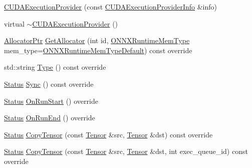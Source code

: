 \begin{DoxyCompactItemize}
\item 
\mbox{\hyperlink{classonnxruntime_1_1CUDAExecutionProvider_a72cfc3ceddf32a30387296364cc3ea35}{C\+U\+D\+A\+Execution\+Provider}} (const \mbox{\hyperlink{structonnxruntime_1_1CUDAExecutionProviderInfo}{C\+U\+D\+A\+Execution\+Provider\+Info}} \&info)
\item 
virtual \mbox{\hyperlink{classonnxruntime_1_1CUDAExecutionProvider_a98fd8afe88815ad4c423edb8e39f7885}{$\sim$\+C\+U\+D\+A\+Execution\+Provider}} ()
\item 
\mbox{\hyperlink{namespaceonnxruntime_a6cdac724c5dcefded3a63f08dae58fda}{Allocator\+Ptr}} \mbox{\hyperlink{classonnxruntime_1_1CUDAExecutionProvider_a01469a525b621ce14a85fcc8187847c4}{Get\+Allocator}} (int id, \mbox{\hyperlink{allocator__info_8h_add3f8ee3ff93395704abae71c30cab18}{O\+N\+N\+X\+Runtime\+Mem\+Type}} mem\+\_\+type=\mbox{\hyperlink{allocator__info_8h_add3f8ee3ff93395704abae71c30cab18a232271cbf46c229ed40272a63af7a204}{O\+N\+N\+X\+Runtime\+Mem\+Type\+Default}}) const override
\item 
std\+::string \mbox{\hyperlink{classonnxruntime_1_1CUDAExecutionProvider_aba2225328bd739b5e6ef4be06557985b}{Type}} () const override
\item 
\mbox{\hyperlink{classonnxruntime_1_1common_1_1Status}{Status}} \mbox{\hyperlink{classonnxruntime_1_1CUDAExecutionProvider_a4f3479126d1191bb1074c4b953b3ef87}{Sync}} () const override
\item 
\mbox{\hyperlink{classonnxruntime_1_1common_1_1Status}{Status}} \mbox{\hyperlink{classonnxruntime_1_1CUDAExecutionProvider_abf7e482aba687b89fcbd6586271ca753}{On\+Run\+Start}} () override
\item 
\mbox{\hyperlink{classonnxruntime_1_1common_1_1Status}{Status}} \mbox{\hyperlink{classonnxruntime_1_1CUDAExecutionProvider_aad4464387bb09d2337e334d5a7325e5d}{On\+Run\+End}} () override
\item 
\mbox{\hyperlink{classonnxruntime_1_1common_1_1Status}{Status}} \mbox{\hyperlink{classonnxruntime_1_1CUDAExecutionProvider_a6f2ec2e4082683b6de03eeb48acbf546}{Copy\+Tensor}} (const \mbox{\hyperlink{classonnxruntime_1_1Tensor}{Tensor}} \&src, \mbox{\hyperlink{classonnxruntime_1_1Tensor}{Tensor}} \&dst) const override
\item 
\mbox{\hyperlink{classonnxruntime_1_1common_1_1Status}{Status}} \mbox{\hyperlink{classonnxruntime_1_1CUDAExecutionProvider_a7238cead30fe69540b3df62e6913d579}{Copy\+Tensor}} (const \mbox{\hyperlink{classonnxruntime_1_1Tensor}{Tensor}} \&src, \mbox{\hyperlink{classonnxruntime_1_1Tensor}{Tensor}} \&dst, int exec\+\_\+queue\+\_\+id) const override

\end{DoxyCompactItemize}
